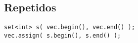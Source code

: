 \documentclass{article}
\begin{document}
\subsection*{Repetidos}
\begin{lstlisting}
set<int> s( vec.begin(), vec.end() );
vec.assign( s.begin(), s.end() );
\end{lstlisting}


\pagebreak



\pagebreak

\pagebreak

\pagebreak

\pagebreak

\pagebreak
\end{document}
